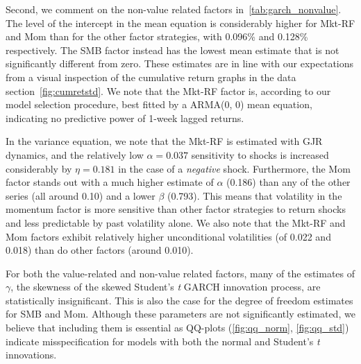 Second, we comment on the non-value related factors in~\autoref{tab:garch_nonvalue}. The level of the intercept in the mean equation is considerably higher for Mkt-RF and Mom than for the other factor strategies, with 0.096\% and 0.128\% respectively. The SMB factor instead has the lowest mean estimate that is not significantly different from zero. These estimates are in line with our expectations from a visual inspection of the cumulative return graphs in the data section~\autoref{fig:cumretstd}. We note that the Mkt-RF factor is, according to our model selection procedure, best fitted by a ARMA(0, 0) mean equation, indicating no predictive power of 1-week lagged returns. 

In the variance equation, we note that the Mkt-RF is estimated with GJR dynamics, and the relatively low $\alpha = 0.037$ sensitivity to shocks is increased considerably by $\eta = 0.181$ in the case of a \emph{negative} shock. Furthermore, the Mom factor stands out with a much higher estimate of $\alpha$ (0.186) than any of the other series (all around 0.10) and a lower $\beta$ (0.793). This means that volatility in the momentum factor is more sensitive than other factor strategies to return shocks and less predictable by past volatility alone. We also note that the Mkt-RF and Mom factors exhibit relatively higher unconditional volatilities (of 0.022 and 0.018) than do other factors (around 0.010).

For both the value-related and non-value related factors, many of the estimates of $\gamma$, the skewness of the skewed Student's \textit{t} GARCH innovation process, are statistically insignificant. This is also the case for the degree of freedom estimates for SMB and Mom. Although these parameters are not significantly estimated, we believe that including them is essential as QQ-plots (\autoref{fig:qq_norm}, \autoref{fig:qq_std}) indicate misspecification for models with both the normal and Student's \textit{t} innovations.


